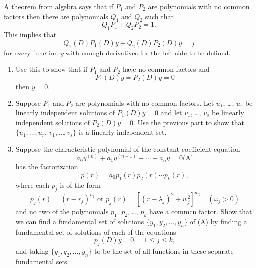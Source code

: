 \documentclass{ximera}
\begin{document}
\begin{problem}\label{exer:9.2.40}
A theorem from algebra says that if $P_1$ and $P_2$ are polynomials
with no common factors then there are polynomials $Q_1$ and $Q_2$
such that
$$
Q_1P_1+Q_2P_2=1.
$$
This implies that
$$
Q_1(D)P_1(D)y+Q_2(D)P_2(D)y=y
$$
for every function $y$ with enough derivatives for the left side to be
defined.

\begin{enumerate}
\item %
Use this to show that if $P_1$ and $P_2$ have no common factors and
$$
P_1(D)y=P_2(D)y=0
$$
then $y=0$.

\item %
Suppose $P_1$ and $P_2$ are polynomials with no common factors.
Let $u_1$, \dots, $u_r$ be linearly independent solutions of $P_1(D)y=0$
and let $v_1$, \dots, $v_s$ be linearly independent solutions of
$P_2(D)y=0$. Use the previous part to show that $\{u_1,\dots,u_r,\,
v_1,\dots,v_s\}$ is a linearly independent set.

\item %
Suppose the characteristic polynomial of the constant coefficient
equation
$$
a_0y^{(n)}+a_1y^{(n-1)}+\cdots+a_ny=0
\text{(A)}
$$
has the factorization
$$
p(r)=a_0p_1(r)p_2(r)\cdots p_k(r),
$$
where each $p_j$ is of the form
$$
p_j(r)=(r-r_j)^{n_j} \mbox{ or }
p_j(r)=[(r-\lambda_j)^2+w^2_j]^{m_j}\quad  (\omega_j>0)
$$
and no two of the polynomials $p_1$, $p_2$, \dots, $p_k$ have a common
factor. Show that we can find a fundamental set of solutions
$\{y_1,y_2,\dots,y_n\}$ of {\rm(A)} by finding a
fundamental set of solutions of each of the equations
$$
p_j(D)y=0,\quad 1\le j\le k,
$$
 and taking $\{y_1,y_2,\dots,y_n\}$ to be the set of all
functions in these separate fundamental sets.
\end{enumerate}
\end{problem}
\end{document}
